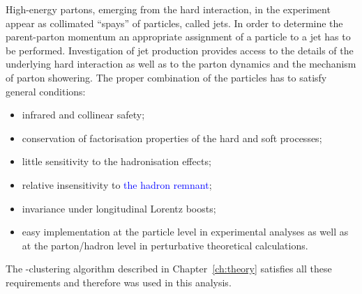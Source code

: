 High-energy partons, emerging from the hard interaction, in the experiment appear as collimated ``spays'' of particles, called jets. In order to determine the parent-parton momentum an appropriate assignment of a particle to a jet has to be performed. Investigation of jet production provides access to the details of the underlying hard interaction as well as to the parton dynamics and the mechanism of parton showering. The proper combination of the particles has to satisfy general conditions:
\begin{itemize}
	\item infrared and collinear safety;
	\item conservation of factorisation properties of the hard and soft processes;
	\item little sensitivity to the hadronisation effects;
	\item relative insensitivity to \textcolor{blue}{the hadron remnant};
	\item invariance under longitudinal Lorentz boosts;
	\item easy implementation at the particle level in experimental analyses as well as at the parton/hadron level in perturbative theoretical calculations.
\end{itemize}
The \kt-clustering algorithm described in Chapter~\ref{ch:theory} satisfies all these requirements and therefore was used in this analysis.